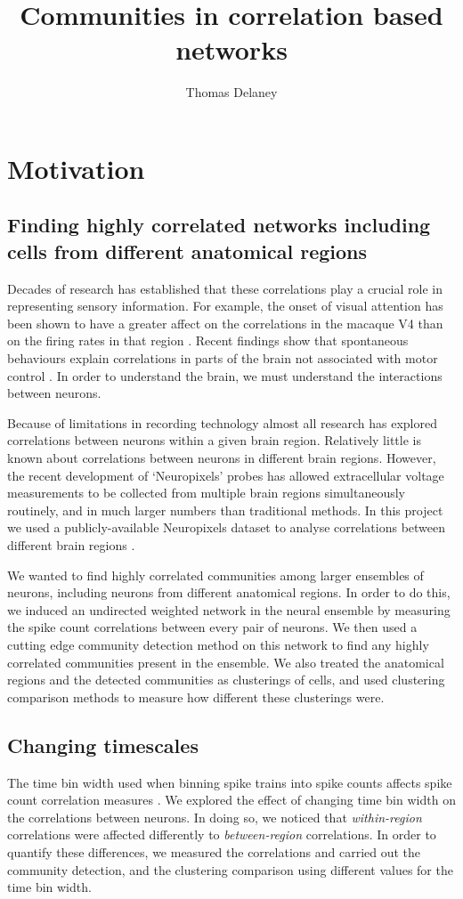 \documentclass[a4paper,12pt]{article}
\title{Communities in correlation based networks}
\author{Thomas Delaney}
\theoremstyle{definition}
\begin{document}
\tableofcontents

\newpage

\section{Motivation}
    \subsection{Finding highly correlated networks including cells from different anatomical regions}
    Decades of research has established that these correlations play a crucial role in representing sensory information. For example, the onset of visual attention has been shown to have a greater affect on the correlations in the macaque V4 than on the firing rates in that region \cite{cohen1}. Recent findings show that spontaneous behaviours explain correlations in parts of the brain not associated with motor control \cite{stringer}. In order to understand the brain, we must understand the interactions between neurons. 

    Because of limitations in recording technology almost all research has explored correlations between neurons within a given brain region. Relatively little is known about correlations between neurons in different brain regions. However, the recent development of `Neuropixels' probes \cite{jun} has allowed extracellular voltage measurements to be collected from multiple brain regions simultaneously routinely, and in much larger numbers than traditional methods. In this project we used a publicly-available Neuropixels dataset to analyse correlations between different brain regions \cite{stringer}.

    We wanted to find highly correlated communities among larger ensembles of neurons, including neurons from different anatomical regions. In order to do this, we induced an undirected weighted network in the neural ensemble by measuring the spike count correlations between every pair of neurons. We then used a cutting edge community detection method \cite{humphries} on this network to find any highly correlated communities present in the ensemble. We also treated the anatomical regions and the detected communities as clusterings of cells, and used clustering comparison methods to measure how different these clusterings were.

    \subsection{Changing timescales}
    The time bin width used when binning spike trains into spike counts affects spike count correlation measures \cite{cohen2}. We explored the effect of changing time bin width on the correlations between neurons. In doing so, we noticed that \textit{within-region} correlations were affected differently to \textit{between-region} correlations. In order to quantify these differences, we measured the correlations and carried out the community detection, and the clustering comparison using different values for the time bin width. 
    
\end{document}
